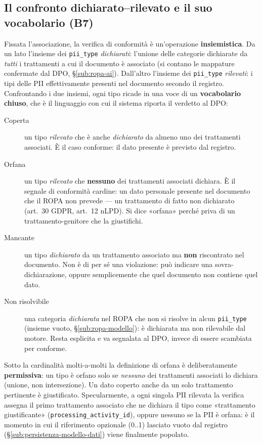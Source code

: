 \subsection{Il confronto dichiarato--rilevato e il suo vocabolario (B7)}
\label{sub:b7-vocabolario}

Fissata l'associazione, la verifica di conformità è un'operazione \textbf{insiemistica}. Da un lato l'insieme dei \texttt{pii\_type} \emph{dichiarati}: l'unione delle categorie dichiarate da \emph{tutti} i trattamenti a cui il documento è associato (si contano le mappature confermate dal DPO, §\ref{sub:ropa-ai}). Dall'altro l'insieme dei \texttt{pii\_type} \emph{rilevati}: i tipi delle PII effettivamente presenti nel documento secondo il registro. Confrontando i due insiemi, ogni tipo ricade in una voce di un \textbf{vocabolario chiuso}, che è il linguaggio con cui il sistema riporta il verdetto al DPO:

\begin{description}
	\item[Coperta] un tipo \emph{rilevato} che è anche \emph{dichiarato} da almeno uno dei trattamenti associati. È il caso conforme: il dato presente è previsto dal registro.
	\item[Orfana] un tipo \emph{rilevato} che \textbf{nessuno} dei trattamenti associati dichiara. È il segnale di conformità cardine: un dato personale presente nel documento che il ROPA non prevede --- un trattamento di fatto non dichiarato (art.~30 GDPR, art.~12 nLPD). Si dice «orfana» perché priva di un trattamento-genitore che la giustifichi.
	\item[Mancante] un tipo \emph{dichiarato} da un trattamento associato ma \textbf{non} riscontrato nel documento. Non è di per sé una violazione: può indicare una sovra-dichiarazione, oppure semplicemente che quel documento non contiene quel dato.
	\item[Non risolvibile] una categoria \emph{dichiarata} nel ROPA che non si risolve in alcun \texttt{pii\_type} (insieme vuoto, §\ref{sub:ropa-modello}): è dichiarata ma non rilevabile dal motore. Resta esplicita e va segnalata al DPO, invece di essere scambiata per conforme.
\end{description}

Sotto la cardinalità molti-a-molti la definizione di orfana è deliberatamente \textbf{permissiva}: un tipo è orfano solo se \emph{nessuno} dei trattamenti associati lo dichiara (unione, non intersezione). Un dato coperto anche da un solo trattamento pertinente è giustificato. Specularmente, a ogni singola PII rilevata la verifica assegna il primo trattamento associato che ne dichiara il tipo come «trattamento giustificante» (\texttt{processing\_activity\_id}), oppure nessuno se la PII è orfana: è il momento in cui il riferimento opzionale (0..1) lasciato vuoto dal registro (§\ref{sub:persistenza-modello-dati}) viene finalmente popolato.

